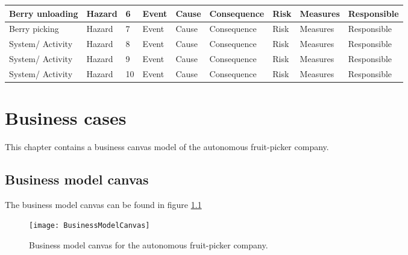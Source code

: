 \documentclass[%
oneside,    %
project,    %
nosummary   %
]{USN-MSc}
\begin{document}
\begin{landscape}
\begin{table}[!ht]
\begin{tabular}{ | m{2cm} | m{2cm} | m{1cm} | m{3cm} | m{3cm} | m{3cm} | m{2cm} | m{2cm} | m{2cm} |}
     Berry unloading & Hazard & 6 & Event & Cause & Consequence & Risk & Measures & Responsible \\ \hline

     Berry picking & Hazard & 7 & Event & Cause & Consequence & Risk & Measures & Responsible \\ \hline

     System/ Activity & Hazard & 8 & Event & Cause & Consequence & Risk & Measures & Responsible \\ \hline

     System/ Activity & Hazard & 9 & Event & Cause & Consequence & Risk & Measures & Responsible \\ \hline

     System/ Activity & Hazard & 10 & Event & Cause & Consequence & Risk & Measures & Responsible \\ \hline

     \end{tabular}
     \label{tab:hazid}
 \end{table}
\end{landscape}


\chapter{Business cases}
\label{ch:Business}
This chapter contains a business canvas model of the autonomous fruit-picker company.
\section{Business model canvas}
The business model canvas can be found in figure \ref{fig:BMC}

\begin{landscape}
  \begin{figure}[!ht]
    \centering
    \texttt{[image: BusinessModelCanvas]}
    \caption{Business model canvas for the autonomous fruit-picker company.}
    \label{fig:BMC}
  \end{figure}
\end{landscape}

~\nocite{*}

\cleardoublepage

\printbibliography[heading=bibintoc, title={References}]
\end{document}
